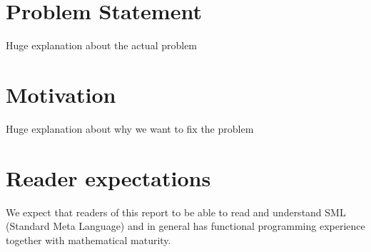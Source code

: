 
\section{Problem Statement}

Huge explanation about the actual problem

\section{Motivation}

Huge explanation about why we want to fix the problem

\section{Reader expectations}


We expect that readers of this report to be able to read and understand SML
(Standard Meta Language) and in general has functional programming experience
together with mathematical maturity.





